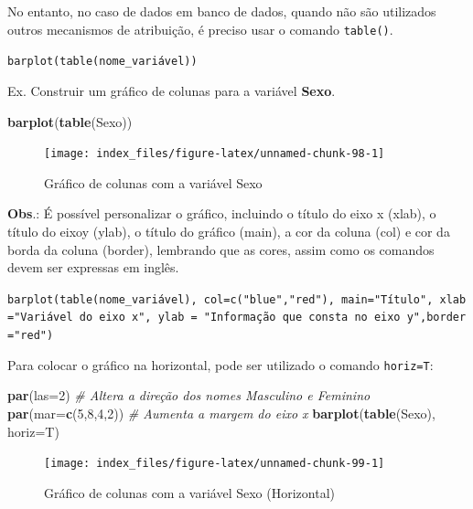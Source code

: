 \documentclass[12pt,brazil,oneside]{book}
\newenvironment{Shaded}{\begin{snugshade}}{\end{snugshade}}
\newcommand{\CommentTok}[1]{\textcolor[rgb]{0.56,0.35,0.01}{\textit{#1}}}
\newcommand{\DataTypeTok}[1]{\textcolor[rgb]{0.13,0.29,0.53}{#1}}
\newcommand{\DecValTok}[1]{\textcolor[rgb]{0.00,0.00,0.81}{#1}}
\newcommand{\KeywordTok}[1]{\textcolor[rgb]{0.13,0.29,0.53}{\textbf{#1}}}
\newcommand{\NormalTok}[1]{#1}
\begin{document}
No entanto, no caso de dados em banco de dados, quando não são utilizados outros mecanismos de atribuição, é preciso usar o comando \texttt{table()}.

\texttt{barplot(table(nome\_variável))}

Ex. Construir um gráfico de colunas para a variável \textbf{Sexo}.

\begin{Shaded}
\begin{Highlighting}[]
\KeywordTok{barplot}\NormalTok{(}\KeywordTok{table}\NormalTok{(Sexo))}
\end{Highlighting}
\end{Shaded}

\begin{figure}[H]

{\centering \texttt{[image: index\_files/figure-latex/unnamed-chunk-98-1]} 

}

\caption{Gráfico de colunas com a variável Sexo}\label{fig:unnamed-chunk-98}
\end{figure}

\textbf{Obs}.: É possível personalizar o gráfico, incluindo o título do eixo x (xlab), o título do eixoy (ylab), o título do gráfico (main), a cor da coluna (col) e cor da borda da coluna (border), lembrando que as cores, assim como os comandos devem ser expressas em inglês.

\texttt{barplot(table(nome\_variável),\ col=c("blue","red"),\ main="Título",\ xlab="Variável\ do\ eixo\ x",\ ylab\ =\ "Informação\ que\ consta\ no\ eixo\ y",border="red")}

Para colocar o gráfico na horizontal, pode ser utilizado o comando \texttt{horiz=T}:

\begin{Shaded}
\begin{Highlighting}[]
\KeywordTok{par}\NormalTok{(}\DataTypeTok{las=}\DecValTok{2}\NormalTok{) }\CommentTok{# Altera a direção dos nomes Masculino e Feminino}
\KeywordTok{par}\NormalTok{(}\DataTypeTok{mar=}\KeywordTok{c}\NormalTok{(}\DecValTok{5}\NormalTok{,}\DecValTok{8}\NormalTok{,}\DecValTok{4}\NormalTok{,}\DecValTok{2}\NormalTok{)) }\CommentTok{# Aumenta a margem do eixo x}
\KeywordTok{barplot}\NormalTok{(}\KeywordTok{table}\NormalTok{(Sexo), }\DataTypeTok{horiz=}\NormalTok{T)}
\end{Highlighting}
\end{Shaded}

\begin{figure}[H]

{\centering \texttt{[image: index\_files/figure-latex/unnamed-chunk-99-1]} 

}

\caption{Gráfico de colunas com a variável Sexo (Horizontal)}\label{fig:unnamed-chunk-99}
\end{figure}
\end{document}
